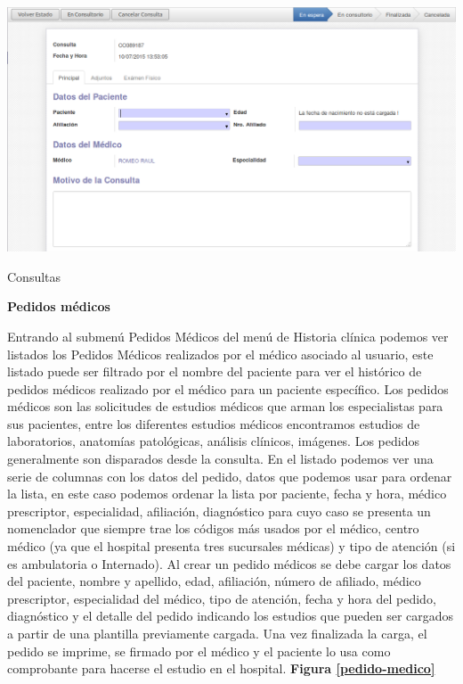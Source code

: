 \begin{correccionFigure}[h]
      \centering
      \includegraphics[width=.8\textwidth]{img/tp1/HE/ConsultaDia}
      \caption{Consultas}
      \label{consulta-dia}
\end{correccionFigure}


\textbf{Pedidos médicos}

Entrando al submenú Pedidos Médicos del menú de Historia clínica podemos ver listados los Pedidos Médicos realizados por el médico asociado al usuario, este listado puede ser filtrado por el nombre del paciente para ver el histórico de pedidos médicos realizado por el médico para un paciente específico. Los pedidos médicos son las solicitudes de estudios médicos que arman los especialistas para sus pacientes, entre los diferentes estudios médicos encontramos estudios de laboratorios, anatomías patológicas, análisis clínicos, imágenes. Los pedidos generalmente son disparados desde la consulta. En el listado podemos ver una serie de columnas con los datos del pedido, datos que podemos usar para ordenar la lista, en este caso podemos ordenar la lista por paciente, fecha y hora, médico prescriptor, especialidad, afiliación, diagnóstico para cuyo caso se presenta un nomenclador que siempre trae los códigos más usados por el médico, centro médico (ya que el hospital presenta tres sucursales médicas) y tipo de atención (si es ambulatoria o Internado). Al crear un pedido médicos se debe cargar los datos del paciente, nombre y apellido, edad, afiliación, número de afiliado, médico prescriptor, especialidad del médico, tipo de atención, fecha y hora del pedido, diagnóstico y el detalle del pedido indicando los estudios que pueden ser cargados a partir de una plantilla previamente cargada. Una vez finalizada la carga, el pedido se imprime, se firmado por el médico y el paciente lo usa como comprobante para hacerse el estudio en el hospital. \textbf{Figura \ref{pedido-medico}}

